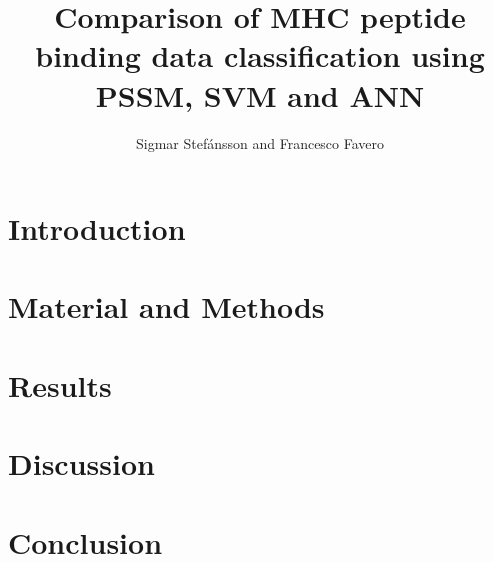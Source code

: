 \documentclass{bioinfo}
\begin{document}
\begin{application}

\title[PSSM,ANN,SVM]{Comparison of MHC peptide binding data classification using PSSM, SVM and ANN}
\author[Sigmar Stef\'{a}nsson, Francesco Favero]{Sigmar Stef\'{a}nsson and Francesco Favero}

\address{Danmarks Tekniske Univeristet}



\maketitle

\begin{abstract}

   


\end{abstract}

\section*{Introduction}
   


\section*{Material and Methods}
   


\section*{Results}
   



\section*{Discussion}
   

\section*{Conclusion}
   
\newpage





%
%
%
%
%






\end{application}
\end{document}
